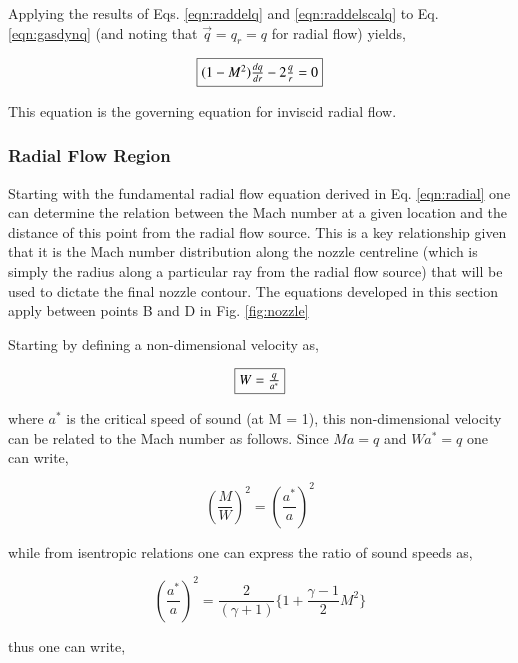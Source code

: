 	Applying the results of Eqs. \ref{eqn:raddelq} and \ref{eqn:raddelscalq} to 
Eq. \ref{eqn:gasdynq} (and noting that $\vec{q} = q_r = q$ for radial flow) yields,

\begin{equation}
	\fbox{$
	(1 - M^2)\frac{dq}{dr} - 2\frac{q}{r} = 0
	$}
\label{eqn:radial}
\end{equation}

	This equation is the governing equation for inviscid radial flow. 


\subsubsection{Radial Flow Region}
	
	Starting with the fundamental radial flow equation derived in
Eq. \ref{eqn:radial} one can determine the relation between the Mach number at a given
location and the distance of this point from the radial flow source.  This is a key relationship
given that it is the Mach number distribution along the nozzle centreline 
(which is simply the radius along a particular ray from the 
radial flow source) that will be used to dictate the final nozzle contour.  The equations 
developed in this section apply between points B and D in Fig. \ref{fig:nozzle}  

	Starting by defining a non-dimensional velocity as,

\begin{equation}
	\fbox{$
	W = \frac{q}{a^*}
	$}
\label{eqn:w}
\end{equation}  
	
	where $a^*$ is the critical speed of sound (at M = 1), this non-dimensional
velocity can be related to the Mach number as follows.  Since $Ma = q$ and $Wa^*=q$ one can
write,

\begin{displaymath}
	(\frac{M}{W})^2 = (\frac{a^*}{a})^2
\end{displaymath}

	while from isentropic relations one can express the ratio of sound speeds as,

\begin{equation}
	(\frac{a^*}{a})^2 = \frac{2}{(\gamma + 1)}\Big\{1 + \frac{\gamma-1}{2}M^2\Big\} 
\label{eqn:isenaratio}
\end{equation}

	thus one can write,

